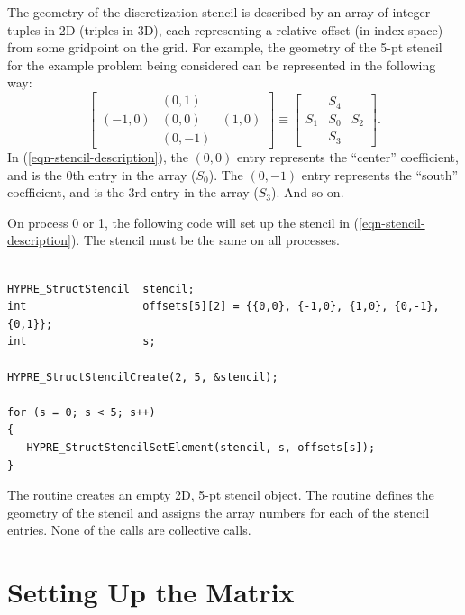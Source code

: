 The geometry of the discretization stencil is described by an array of
integer tuples in 2D (triples in 3D), each representing a relative
offset (in index space) from some gridpoint on the grid.  For example,
the geometry of the 5-pt stencil for the example problem being
considered can be represented in the following way:
\begin{equation}\label{eqn-stencil-description}
\left [
\begin{array}{ccc}
        & ( 0, 1) &         \\
(-1, 0) & ( 0, 0) & ( 1, 0) \\
        & ( 0,-1) &        
\end{array}
\right ]
\equiv
\left [
\begin{array}{ccc}
    & S_4 &     \\
S_1 & S_0 & S_2 \\
    & S_3 &    
\end{array}
\right ] .
\end{equation}
In (\ref{eqn-stencil-description}), the $(0,0)$ entry represents the
``center'' coefficient, and is the 0th entry in the array ($S_0$).
The $(0,-1)$ entry represents the ``south'' coefficient, and is the
3rd entry in the array ($S_3$).  And so on.

On process 0 or 1, the following code will set up the stencil in
(\ref{eqn-stencil-description}).  The stencil must be the same on all
processes.
\begin{display}
\begin{verbatim}

HYPRE_StructStencil  stencil;
int                  offsets[5][2] = {{0,0}, {-1,0}, {1,0}, {0,-1}, {0,1}};
int                  s;

HYPRE_StructStencilCreate(2, 5, &stencil);

for (s = 0; s < 5; s++)
{
   HYPRE_StructStencilSetElement(stencil, s, offsets[s]);
}

\end{verbatim}
\end{display}
The  routine creates an empty 2D, 5-pt stencil object.
The  routine defines the geometry of the stencil
and assigns the array numbers for each of the stencil entries.  None
of the calls are collective calls.


\section{Setting Up the Matrix}
\label{Setting Up the Matrix}


